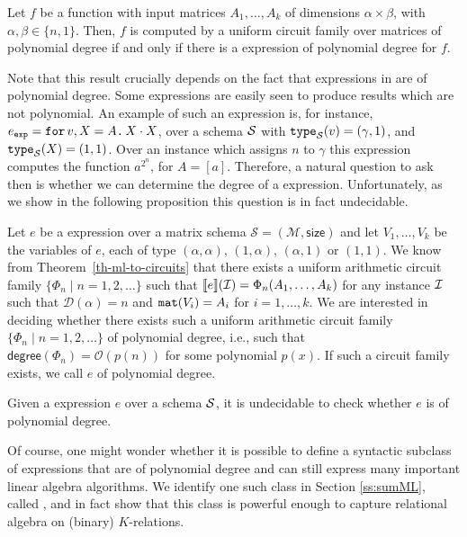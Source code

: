 \begin{corollary}
\label{th-equivalence}
Let $f$ be a function with input matrices $A_1,\ldots ,A_k$ of dimensions $\alpha\times \beta$, with $\alpha,\beta \in \{n,1\}$. Then, $f$ is computed by a uniform circuit family over matrices of polynomial degree if and only if there is a \langfor expression of polynomial degree for $f$. 
\end{corollary}

Note that this result crucially depends on the fact that expressions in \langfor are of polynomial degree.
Some \langfor expressions are easily seen to produce results which are not polynomial.
An example of such an expression is, for instance, $e_{\texttt{exp}} = \texttt{for}\, v,X=A \texttt{.}\, X\cdot X$, over a schema $\mathcal{S}$ with $\texttt{type}_{\mathcal{S}}(v)= (\gamma,1)$, and $\texttt{type}_{\mathcal{S}}(X)=(1,1)$.
Over an instance which assigns $n$ to $\gamma$ this expression computes the function $a^{2^n}$, for $A=[a]$.
Therefore, a natural question to ask then is whether we can determine the degree of a \langfor expression.
Unfortunately, as we show in the following proposition this question is in fact undecidable.

Let $e$ be a \langfor expression over a matrix schema $\mathcal{S}=(\mathcal{M},\textsf{size})$ and let $V_1,\ldots, V_k$ be
the variables of $e$, each of type $(\alpha,\alpha)$, $(1,\alpha)$, $(\alpha,1)$ or $(1,1)$. We know from Theorem~\ref{th-ml-to-circuits}
that there exists a uniform arithmetic circuit family $\{\Phi_n \mid n=1,2,\ldots\}$
such that $\llbracket e \rrbracket(\mathcal{I})=\Phi_n(A_1,\ldots,A_k)$ for any instance $\mathcal{I}$ such that
$\mathcal{D}(\alpha)=n$ and $\texttt{mat}(V_i)=A_i$ for $i=1,\ldots,k$. We are interested in deciding
whether there exists such a  uniform arithmetic circuit family $\{\Phi_n \mid n=1,2,\ldots\}$
of polynomial degree, i.e., such that $\mathsf{degree}(\Phi_n)=\mathcal{O}(p(n))$ for some polynomial $p(x)$. If such a circuit family exists, we call $e$ of polynomial degree.

\begin{proposition}
\label{prop-undec}
Given a \langfor expression $e$ over a schema $\mathcal{S}$, it is undecidable to check whether $e$ is of polynomial degree.
\end{proposition}



Of course, one might wonder whether it is possible to define a syntactic subclass of \langfor expressions that are of polynomial degree and can still express many important linear algebra algorithms. We identify one such class in Section \ref{ss:sumML}, called \langsum, and in fact show that this class is powerful enough to capture relational algebra on (binary) $K$-relations. 

